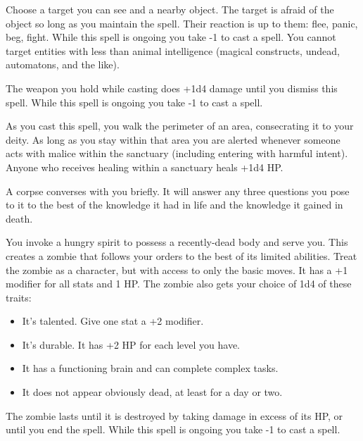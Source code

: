  Choose a target you can see and a nearby object. The target is afraid of the object so long as you maintain the spell. Their reaction is up to them: flee, panic, beg, fight. While this spell is ongoing you take -1 to cast a spell. You cannot target entities with less than animal intelligence (magical constructs, undead, automatons, and the like).





 The weapon you hold while casting does +1d4 damage until you dismiss this spell. While this spell is ongoing you take -1 to cast a spell.




 As you cast this spell, you walk the perimeter of an area, consecrating it to your deity. As long as you stay within that area you are alerted whenever someone acts with malice within the sanctuary (including entering with harmful intent). Anyone who receives healing within a sanctuary heals +1d4 HP.




 A corpse converses with you briefly. It will answer any three questions you pose to it to the best of the knowledge it had in life and the knowledge it gained in death.





 You invoke a hungry spirit to possess a recently-dead body and serve you. This creates a zombie that follows your orders to the best of its limited abilities. Treat the zombie as a character, but with access to only the basic moves. It has a +1 modifier for all stats and 1 HP. The zombie also gets your choice of 1d4 of these traits:
\begin{itemize}
\item It's talented. Give one stat a +2 modifier.
\item It's durable. It has +2 HP for each level you have.
\item It has a functioning brain and can complete complex tasks.
\item It does not appear obviously dead, at least for a day or two.

\end{itemize}


 The zombie lasts until it is destroyed by taking damage in excess of its HP, or until you end the spell. While this spell is ongoing you take -1 to cast a spell.


